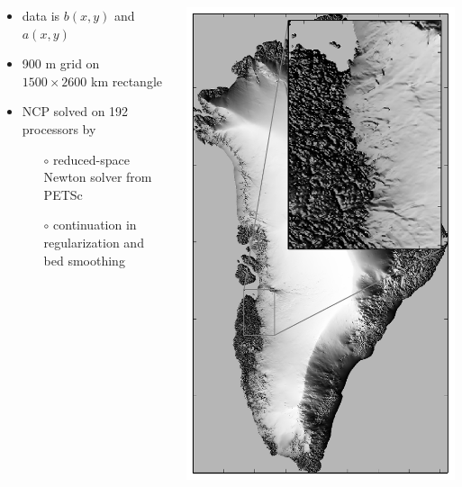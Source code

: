 \documentclass[hide notes,intlimits]{beamer}
\begin{document}
\begin{frame}
\begin{columns}
\begin{column}{0.6\textwidth}
\vfill
\begin{itemize}
\item data is $b(x,y)$ and $a(x,y)$
\item 900 m grid on $1500\times 2600$ km rectangle
\item NCP solved on 192 processors by
  \begin{itemize}
  \item[$\circ$] reduced-space Newton solver from PETSc
  \item[$\circ$] continuation in regularization and bed smoothing
  \end{itemize}
\end{itemize}
\end{column}
\begin{column}{0.4\textwidth}
\includegraphics[height=0.9\textheight]{grnwinset}
\end{column}
\end{columns}

\end{frame}
\end{document}

